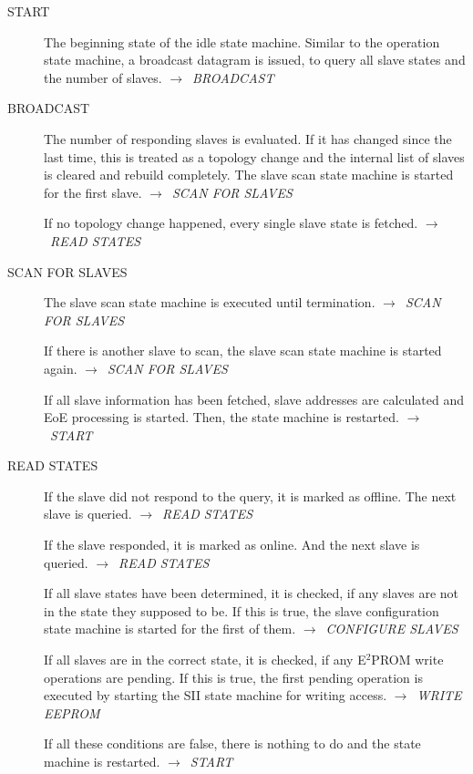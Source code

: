 \documentclass[a4paper,12pt,BCOR6mm,bibtotoc,idxtotoc]{scrbook}
\begin{document}
\begin{description}
\item[START] The beginning state of the idle state machine. Similar to
  the operation state machine, a broadcast datagram is issued, to
  query all slave states and the number of slaves.
  $\rightarrow$~\textit{BROADCAST}

\item[BROADCAST] The number of responding slaves is evaluated. If it
  has changed since the last time, this is treated as a topology
  change and the internal list of slaves is cleared and rebuild
  completely. The slave scan state machine is started for the first
  slave. $\rightarrow$~\textit{SCAN FOR SLAVES}

  If no topology change happened, every single slave state is fetched.
  $\rightarrow$~\textit{READ STATES}

\item[SCAN FOR SLAVES] The slave scan state machine is executed until
  termination. $\rightarrow$~\textit{SCAN FOR SLAVES}

  If there is another slave to scan, the slave scan state machine is
  started again. $\rightarrow$~\textit{SCAN FOR SLAVES}

  If all slave information has been fetched, slave addresses are
  calculated and EoE processing is started. Then, the state machine is
  restarted. $\rightarrow$~\textit{START}

\item[READ STATES] If the slave did not respond to the query, it is
  marked as offline. The next slave is queried.
  $\rightarrow$~\textit{READ STATES}

  If the slave responded, it is marked as online. And the next slave
  is queried. $\rightarrow$~\textit{READ STATES}

  If all slave states have been determined, it is checked, if any
  slaves are not in the state they supposed to be. If this is true,
  the slave configuration state machine is started for the first of
  them. $\rightarrow$~\textit{CONFIGURE SLAVES}

  If all slaves are in the correct state, it is checked, if any
  E$^2$PROM write operations are pending. If this is true, the first
  pending operation is executed by starting the SII state machine for
  writing access. $\rightarrow$~\textit{WRITE EEPROM}

  If all these conditions are false, there is nothing to do and the
  state machine is restarted. $\rightarrow$~\textit{START}


\end{description}
\end{document}

